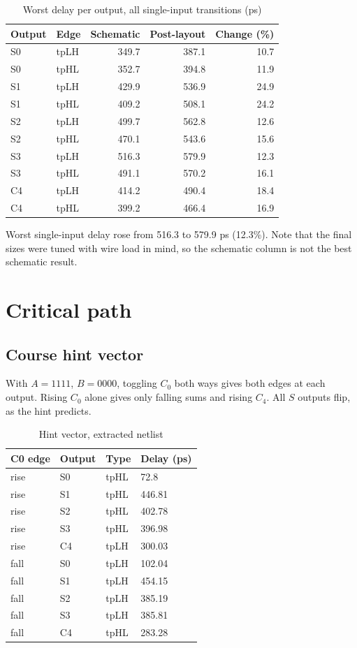 \documentclass[10pt,a4paper]{article}
\begin{document}
\begin{table}[H]\centering
\footnotesize
\caption{Worst delay per output, all single-input transitions (ps)}
\begin{tabular}{llrrr}
\toprule
\textbf{Output} & \textbf{Edge} & \textbf{Schematic} & \textbf{Post-layout} & \textbf{Change (\%)} \\
\midrule
S0 & tpLH & 349.7 & 387.1 & 10.7 \\
S0 & tpHL & 352.7 & 394.8 & 11.9 \\
S1 & tpLH & 429.9 & 536.9 & 24.9 \\
S1 & tpHL & 409.2 & 508.1 & 24.2 \\
S2 & tpLH & 499.7 & 562.8 & 12.6 \\
S2 & tpHL & 470.1 & 543.6 & 15.6 \\
S3 & tpLH & 516.3 & 579.9 & 12.3 \\
S3 & tpHL & 491.1 & 570.2 & 16.1 \\
C4 & tpLH & 414.2 & 490.4 & 18.4 \\
C4 & tpHL & 399.2 & 466.4 & 16.9 \\
\bottomrule
\end{tabular}
\end{table}

Worst single-input delay rose from 516.3 to 579.9 ps (12.3\%). Note that the final sizes were tuned with wire load in mind, so the schematic column is not the best schematic result.

\section{Critical path}
\subsection{Course hint vector}
With $A=1111$, $B=0000$, toggling $C_0$ both ways gives both edges at each output. Rising $C_0$ alone gives only falling sums and rising $C_4$. All $S$ outputs flip, as the hint predicts.

\begin{table}[H]\centering
\footnotesize
\caption{Hint vector, extracted netlist}
\begin{tabular}{llll}
\toprule
\textbf{C0 edge} & \textbf{Output} & \textbf{Type} & \textbf{Delay (ps)} \\
\midrule
rise & S0 & tpHL & 72.8 \\
rise & S1 & tpHL & 446.81 \\
rise & S2 & tpHL & 402.78 \\
rise & S3 & tpHL & 396.98 \\
rise & C4 & tpLH & 300.03 \\
fall & S0 & tpLH & 102.04 \\
fall & S1 & tpLH & 454.15 \\
fall & S2 & tpLH & 385.19 \\
fall & S3 & tpLH & 385.81 \\
fall & C4 & tpHL & 283.28 \\
\bottomrule
\end{tabular}
\end{table}
\end{document}
